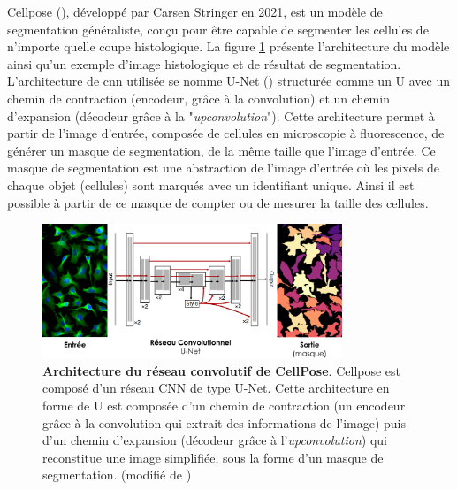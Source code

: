 Cellpose (\cite{stringer_cellpose_2021}), développé par Carsen Stringer en 2021, est un modèle de segmentation généraliste, conçu pour être capable de segmenter les cellules de n'importe quelle coupe histologique. La figure \ref{fig:cellpose_archi} présente l'architecture du modèle ainsi qu'un exemple d'image histologique et de résultat de segmentation. L'architecture de \gls{cnn} utilisée se nomme U-Net (\cite{ronneberger_u-net_2015}) structurée comme un U avec un chemin de contraction (encodeur, grâce à la convolution) et un chemin d'expansion (décodeur grâce à la "\textit{upconvolution}"). Cette architecture permet à partir de l'image d'entrée, composée de cellules en microscopie à fluorescence, de générer un masque de segmentation, de la même taille que l'image d'entrée. Ce masque de segmentation est une abstraction de l'image d'entrée où les pixels de chaque objet (cellules) sont marqués avec un identifiant unique. Ainsi il est possible à partir de ce masque de compter ou de mesurer la taille des cellules.
\begin{figure}[!ht]
 \centering
 \includegraphics[width=0.8\textwidth]{figures/cellpose_archi.png}
 \caption[Architecture du réseau convolutionel de CellPose]{\textbf{Architecture du réseau convolutif de CellPose}. Cellpose est composé d'un réseau CNN de type U-Net. Cette architecture en forme de U est composée d'un chemin de contraction (un encodeur grâce à la convolution qui extrait des informations de l'image) puis d'un chemin d'expansion (décodeur grâce à l'\textit{upconvolution}) qui reconstitue une image simplifiée, sous la forme d'un masque de segmentation. (modifié de \cite{stringer_cellpose_2021})}
 \label{fig:cellpose_archi}
\end{figure}
